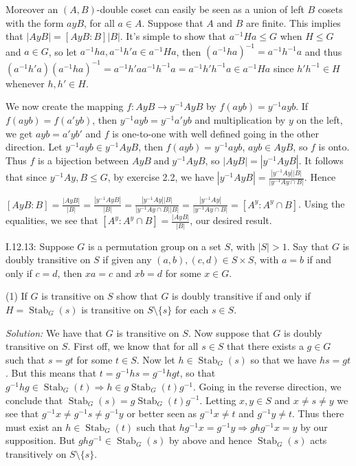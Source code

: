 \documentclass{letter}
\newcommand{\tmem}[1]{{\em #1\/}}
\newcommand{\tmop}[1]{\ensuremath{\operatorname{#1}}}
\begin{document}
Moreover an $(A, B)$-double coset can easily be seen as a union of left $B$
cosets with the form $a y B$, for all $a \in A$. Suppose that $A$ and $B$ are
finite. This implies that $| A y B| = [A y B : B] |B |$. It's simple to show
that $a^{- 1} H a \leq G$ when $H \leq G$ and $a \in G$, so let $a^{- 1} h a,
a^{- 1} h' a \in a^{- 1} H a$, then $(a^{- 1} h a)^{- 1} = a^{- 1} h^{- 1} a$
and thus $(a^{- 1} h' a) (a^{- 1} h a)^{- 1} = a^{- 1} h' a a^{- 1} h^{- 1} a
= a^{- 1} h' h^{- 1} a \in a^{- 1} H a$ since $h' h^{- 1} \in H$ whenever $h,
h' \in H.$

We now create the mapping $f : A y B \rightarrow y^{- 1} A y B$ by $f (a y b)
= y^{- 1} a y b$. If $f (a y b) = f (a' y b)$, then $y^{- 1} a y b = y^{- 1}
a' y b$ and multiplication by $y$ on the left, we get $a y b = a' y b'$ and
$f$ is one-to-one with well defined going in the other direction. Let $y^{- 1}
a y b \in y^{- 1} A y B$, then $f (a y b) = y^{- 1} a y b$, $a y b \in A y B$,
so $f$ is onto. Thus $f$ is a bijection between $A y B \tmop{and} y^{- 1} A y
B$, so $|A y B| = | y^{- 1} A y B|$. It follows that since $y^{- 1} A y, B
\leq G$, by exercise 2.2, we have $|y^{- 1} A y B| = \frac{|y^{- 1} A y| |
B|}{|y^{- 1} A y \cap B|}$. Hence

$[A y B : B] = \frac{|A y B|}{|B|} = \frac{|y^{- 1} A y B|}{|B|} = \frac{|y^{-
1} A y| |B|}{|y^{- 1} A y \cap B||B|} = \frac{|y^{- 1} A y|}{|y^{- 1} A y \cap
B|} = [A^y : A^y \cap B]$. Using the equalities, we see that $[A^y : A^y \cap
B] = \frac{|A y B|}{|B|}$, our desired result.

I.12.13: Suppose $G$ is a permutation group on a set $S$, with $|S| > 1$. Say
that $G$ is doubly transitive on $S$ if given any $(a, b), (c, d) \in S \times
S$, with $a = b$ if and only if $c = d$, then $x a = c$ and $x b = d$ for some
$x \in G$.

(1) If $G$ is transitive on $S$ show that $G$ is doubly transitive if and only
if $H = \tmop{Stab}_G (s)$ is transitive on $S \setminus \{s\}$ for each $s
\in S$.

{\tmem{Solution:}} We have that $G$ is transitive on $S$. Now suppose that $G$
is doubly transitive on $S$. First off, we know that for all $s \in S$ that
there exists a $g \in G$ such that $s = g t$ for some $t \in S$. Now let $h
\in \tmop{Stab}_G (s)$ so that we have $h s = g t$. But this means that $t =
g^{- 1} h s = g^{- 1} h g t$, so that $g^{- 1} h g \in \tmop{Stab}_G (t)
\Rightarrow h \in g \tmop{Stab}_G (t) g^{- 1}$. Going in the reverse
direction, we conclude that $\tmop{Stab}_G (s) = g \tmop{Stab}_G (t) g^{- 1}$.
Letting $x, y \in S$ and $x \neq s \neq y$ we see that $g^{- 1} x \neq g^{- 1}
s \neq g^{- 1} y$ or better seen as $g^{- 1} x \neq t$ and $g^{- 1} y \neq t$.
Thus there must exist an $h \in \tmop{Stab}_G (t)$ such that $h g^{- 1} x =
g^{- 1} y \Rightarrow g h g^{- 1} x = y$ by our supposition. But $g h g^{- 1}
\in \tmop{Stab}_G (s)$ by above and hence $\tmop{Stab}_G (s)$ acts
transitively on $S \setminus \{s\}$.
\end{document}
